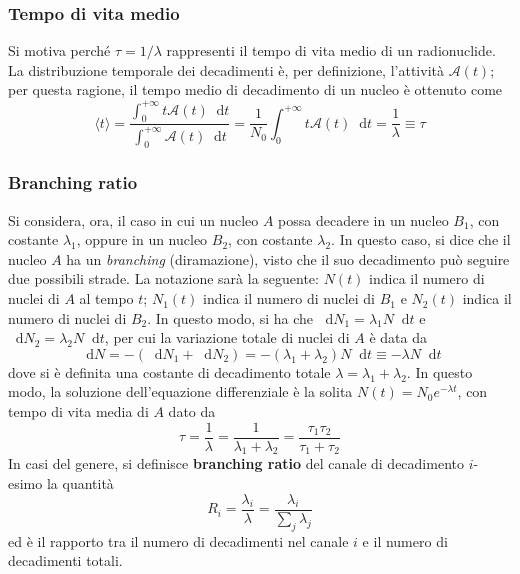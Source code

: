 \documentclass[11pt, a4paper]{scrartcl}
\theoremstyle{style}
\newcommand{\dd}{\mathop{}\!\mathrm{d}}
\numberwithin{equation}{subsection}
\begin{document}
\subsubsection{Tempo di vita medio}

Si motiva perch\'e $\tau  = 1/\lambda $ rappresenti il tempo di vita medio di un radionuclide.
La distribuzione temporale dei decadimenti \`e, per definizione, l'attivit\`a $\mathcal{A} (t)$; per questa ragione, il tempo medio di decadimento di un nucleo \`e ottenuto come
\begin{equation}
	\langle t \rangle = \frac{\displaystyle \int _0^{+\infty}t \mathcal{A} (t) \dd t}{\displaystyle \int _0^{+\infty}\mathcal{A} (t) \dd t} = \frac{1}{N_0} \int _0^{+\infty}t \mathcal{A} (t) \dd t = \frac{1}{\lambda } \equiv \tau 
\end{equation}


\subsubsection{Branching ratio}
Si considera, ora, il caso in cui un nucleo $A$ possa decadere in un nucleo $B_1$, con costante $\lambda _1$, oppure in un nucleo $B_2$, con costante $\lambda _2$.
In questo caso, si dice che il nucleo $A$ ha un \textit{branching} (diramazione), visto che il suo decadimento pu\`o seguire due possibili strade.
La notazione sar\`a la seguente: $N(t)$ indica il numero di nuclei di $A$ al tempo $t$; $N_1(t)$ indica il numero di nuclei di $B_1$ e $N_2(t)$ indica il numero di nuclei di $B_2$.
In questo modo, si ha che $\dd N_1 = \lambda _1 N \dd t$ e $\dd N_2 = \lambda _2 N \dd t$, per cui la variazione totale di nuclei di $A$ \`e data da 
\[
\dd N = - \left(\dd N_1 + \dd N_2\right) = - (\lambda _1 + \lambda _ 2) N \dd t \equiv - \lambda N\dd t
\] 
dove si \`e definita una costante di decadimento totale $\lambda  = \lambda _1 + \lambda _2$.
In questo modo, la soluzione dell'equazione differenziale \`e la solita $N(t) = N_0 e^{-\lambda t}$, con tempo di vita media di $A$ dato da
\begin{equation}
	\tau  = \frac{1}{\lambda }= \frac{1}{\lambda _1 + \lambda _2} = \frac{\tau _1 \tau _2}{ \tau _1 + \tau _2}
\end{equation}
In casi del genere, si definisce \textbf{branching ratio} del canale di decadimento $i$-esimo la quantit\`a 
\begin{equation}
	R_i = \frac{\lambda _i}{\lambda } = \frac{\lambda _i}{\sum_{j}^{} \lambda _j}
\end{equation}
ed \`e il rapporto tra il numero di decadimenti nel canale $i$ e il numero di decadimenti totali.
\end{document}
